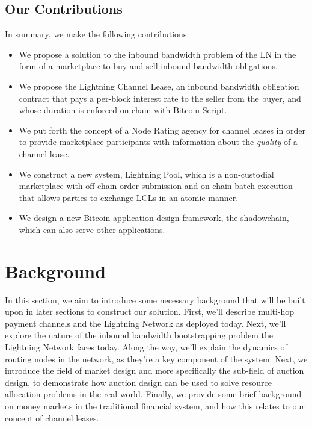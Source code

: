 \documentclass[10pt,a4paper]{article}
\theoremstyle{definition}
\begin{document}
\subsection{Our Contributions}

In summary, we make the following contributions: 

\begin{itemize} 
    \item We propose a solution to the inbound bandwidth problem of the LN in
        the form of a marketplace to buy and sell inbound bandwidth
        obligations.

    \item We propose the Lightning Channel Lease, an inbound bandwidth
        obligation contract that pays a per-block interest rate to the seller
        from the buyer, and whose duration is enforced on-chain with Bitcoin
        Script.  

    \item We put forth the concept of a Node Rating agency for channel leases
        in order to provide marketplace participants with
        information about the \emph{quality} of a channel lease.  

    \item We construct a new system, Lightning Pool, which is a non-custodial
        marketplace with off-chain order submission and on-chain batch
        execution that allows parties to exchange LCLs in an atomic
        manner.  

    \item We design a new Bitcoin application design framework, the
        shadowchain, which can also serve other applications.  
\end{itemize}



\section{Background}

In this section, we aim to introduce some necessary background that will be
built upon in later sections to construct our solution. First, we'll describe
multi-hop payment channels and the Lightning Network as deployed today. Next,
we'll explore the nature of the inbound bandwidth bootstrapping problem the
Lightning Network faces today. Along the way, we'll explain the dynamics of
routing nodes in the network, as they're a key component of the system. Next,
we introduce the field of market design and more specifically the sub-field of auction
design, to demonstrate how auction design can be used to solve resource
allocation problems in the real world. Finally, we provide some brief background
on money markets in the traditional financial system, and how this relates to
our concept of channel leases.
\end{document}
